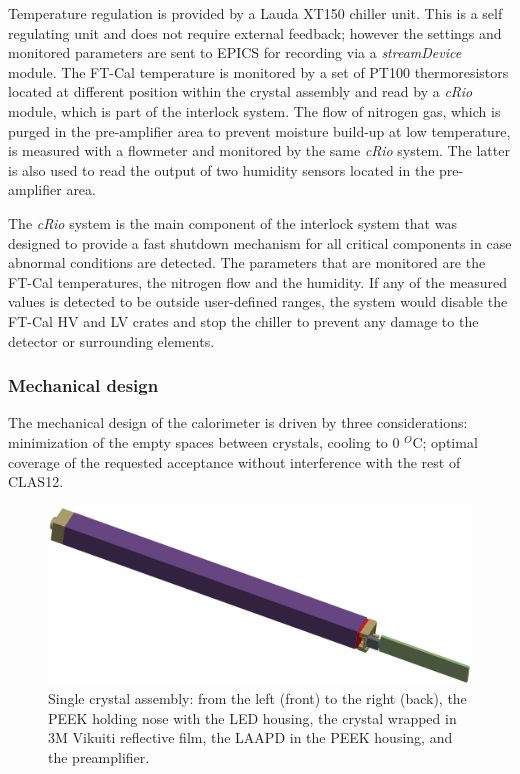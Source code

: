 Temperature regulation is provided by a
Lauda XT150 chiller unit. This is a self regulating
unit and does not require external feedback;
however the settings and monitored parameters are sent to EPICS for recording via a
{\it streamDevice} module.
The FT-Cal temperature is 
 monitored by a set of PT100 thermoresistors located at different position within the crystal assembly and 
read by a {\it cRio} module, which is part of the interlock system. The flow of nitrogen gas, which is purged in the pre-amplifier area to prevent moisture build-up at low temperature, is measured with a flowmeter and monitored by the same {\it cRio} system. The latter is also used to read the output of two humidity sensors located in the pre-amplifier area. 

The {\it cRio} system is the main component of the interlock system that was designed to provide a fast shutdown mechanism for all critical components in case abnormal conditions are detected. The parameters that are monitored are the FT-Cal temperatures, the nitrogen flow and the humidity. If any of the measured values is detected to be outside user-defined ranges, the system would disable the FT-Cal HV and LV crates and stop the chiller to prevent any damage to the detector or surrounding elements.

\subsubsection{Mechanical design}
The mechanical design of the calorimeter is
driven by three considerations: minimization of the empty spaces between
crystals, cooling to 0 $^O$C; optimal coverage of the requested acceptance without interference with the rest
of CLAS12.
\begin{figure}[th!]
\centering 
\includegraphics[width=1.0\columnwidth]{./fig/sc-assembly.eps}
\caption{Single crystal assembly: from the
left (front) to the right (back), the PEEK holding nose with the LED housing, the
crystal wrapped in 3M Vikuiti reflective film, the LAAPD in the PEEK housing, and
the  preamplifier.}
\label{fig:crystalassembly} 
\end{figure}

